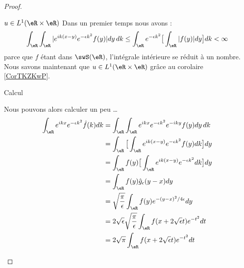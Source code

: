 \begin{proof}
\begin{subproof}
		\begin{subproof}
			\item[\( u\in L^1(\eR\times \eR)\)]
			Dans un premier temps nous avons :
			\begin{equation}
				\int_{\eR}\int_{\eR}|  e^{ik(x-y)} e^{-\epsilon k^2} f(y) |dy\,dk\leq \int_{\eR} e^{-\epsilon k^2} \big[  \int_{\eR}| f(y) |   dy \big] dk<\infty
			\end{equation}
			parce que \( f\) étant dans \( \swS(\eR)\), l'intégrale intérieure se réduit à un nombre. Nous savons maintenant que \( u\in L^1(\eR\times \eR)\) grâce au corolaire \ref{CorTKZKwP}.

			\item[Calcul]

			Nous pouvons alors calculer un peu \ldots
			\begin{subequations}
				\begin{align}
					\int_{\eR} e^{ikx} e^{-\epsilon k^2}\hat f(k)dk & =\int_{\eR}\int_{\eR} e^{ikx} e^{-\epsilon k^2} e^{-iky}f(y)dy\,dk                                                             \\
					                                                & =\int_{\eR}\big[ \int_{\eR} e^{ik(x-y)} e^{-\epsilon k^2}f(y)dk \big]dy    \label{SUBEQooYJATooBdisqE}                         \\
					                                                & =\int_{\eR}f(y)\big[   \int_{\eR} e^{ik(x-y)} e^{-\epsilon k^2}dk  \big]dy                                                     \\
					                                                & =\int_{\eR} f(y)\hat g_{\epsilon}(y-x)dy   \label{SUBEQooXLLMooQazBnM}                                                         \\
					                                                & =\sqrt{ \frac{ \pi }{ \epsilon } }\int_{\eR}f(y) e^{-(y-x)^2/4\epsilon}dy\label{SUBEQooOPQNooPofmvh}                           \\
					                                                & =2\sqrt{ \epsilon }\sqrt{ \frac{ \pi }{ \epsilon } }\int_{\eR}f(x+2\sqrt{ \epsilon }t) e^{-t^2}dt  \label{SUBEQooONHGooNoiBru} \\
					                                                & =2\sqrt{ \pi }\int_{\eR}f(x+2\sqrt{ \epsilon }t) e^{-t^2}dt                                                                    \\
				\end{align}
			\end{subequations}

\end{subproof}
\end{subproof}
\end{proof}
